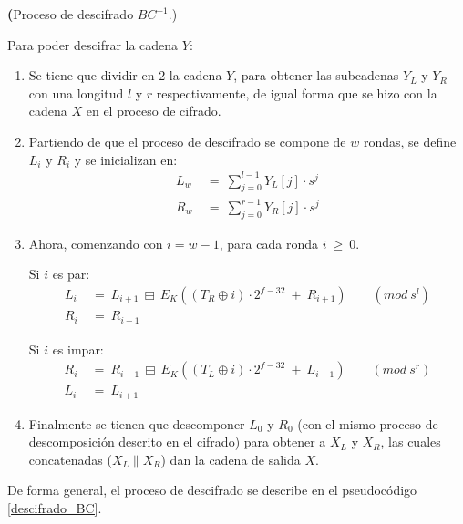 \textbf(Proceso de descifrado $BC^{-1}$.)

Para poder descifrar la cadena $Y$:

\begin{enumerate}

  \item Se tiene que dividir en 2 la cadena $Y$, para obtener las subcadenas
    $Y_L$ y $Y_R$ con una longitud $l$ y $r$ respectivamente, de igual forma
    que se hizo con la cadena $X$ en el proceso de cifrado.

  \item Partiendo de que el proceso de descifrado se compone de $w$ rondas,
    se define $L_i$ y $R_i$ y se inicializan en:
    \begin{align}
      L_w\: &=\: \sum_{j=0}^{l-1} Y_L[j] \cdot s^j \\
      R_w\: &=\: \sum_{j=0}^{r-1} Y_R[j] \cdot s^j
    \end{align}

  \item Ahora, comenzando con $i=w-1$, para cada ronda $i\: \geq\: 0$.

    Si $i$ es par:
    \begin{align}
      L_i\: &=\: L_{i+1}\: \boxminus\:
                E_K((T_R \oplus i) \cdot 2^{f-32}\: +\: R_{i+1})\qquad
                (mod\ s^l) \\
      R_i\: &=\: R_{i+1}
    \end{align}

    Si $i$ es impar:
    \begin{align}
      R_i\: &=\: R_{i+1}\: \boxminus\:
                E_K((T_L \oplus i) \cdot 2^{f-32}\: +\: L_{i+1})\qquad
                (mod\ s^r) \\
      L_i\: &=\: L_{i+1}
    \end{align}

  \item Finalmente se tienen que descomponer $L_0$ y $R_0$ (con el mismo
    proceso de descomposición descrito en el cifrado) para obtener a $X_L$ y
    $X_R$, las cuales concatenadas ($X_L \parallel X_R$) dan la cadena de
    salida $X$.

\end{enumerate}

De forma general, el proceso de descifrado se describe en el pseudocódigo
\ref{descifrado_BC}.

